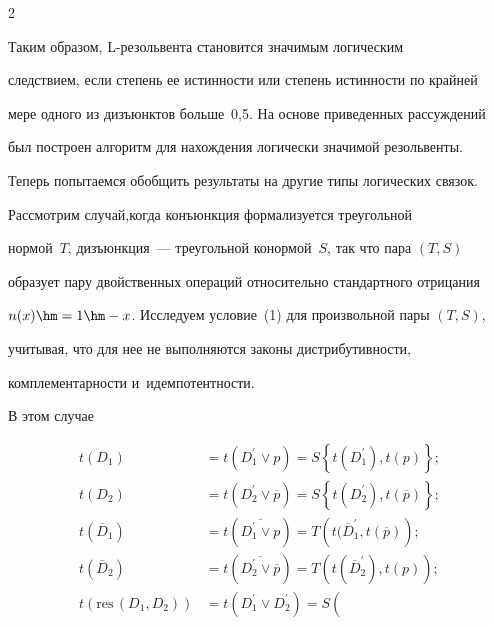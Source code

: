 \begin{multicols}{2}
  


  Таким образом, L-ре\-золь\-вен\-та становится значимым логическим 


следствием, если степень ее истинности или степень истинности по крайней 


мере одного из дизъюнктов больше~0,5. На основе приведенных рассуждений 


был построен алгоритм для нахождения логически значимой резольвенты.


  


  Теперь попытаемся обобщить результаты на другие типы логических связок. 


Рассмотрим случай,\linebreak когда конъюнкция формализуется треугольной 


нормой~$T$, дизъюнкция~--- треугольной конормой~$S$, так что пара $(T,S)$ 


образует пару двойственных операций относительно стандартного отрицания 


$n(x)\hm=1\hm-x$. Исследуем условие~(1) для произвольной пары $(T,S)$, 


учитывая, что для нее не выполняются законы дистрибутивности, 


комплементарности и~идемпотентности.




  В этом случае


  \begin{align*}


  t(D_1)&=t\left(D_1^\prime\vee p\right) =S\left\{ t(D_1^\prime), t(p)\right\};\\


  t(D_2)&=t\left(D_2^\prime\vee \overline{p}\right) =S\left\{ t(D_2^\prime), 


t(\overline{p})\right\};\\


  t\left(\overline{D}_1\right) &=t\left( \overline{D_1^\prime\vee p}\right) =T\left( 


t(\overline{D}_1^\prime, t\left(\overline{p}\right)\right);\\


  t\left( \overline{D}_2\right) &=t\left( \overline{D_2^\prime \vee 


\overline{p}}\right) =T\left( t\left(\overline{D}_2^\prime\right),  t(p)\right);\\


  t\left( \mathrm{res}\, (D_1, D_2)\right) &= t(D_1^\prime\vee D_2^\prime) =S\left( 



\end{align*}
\end{multicols}

